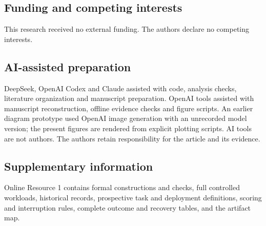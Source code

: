 \documentclass[10pt,a4paper,twocolumn]{article}
\begin{document}
\subsection*{Funding and competing interests}
This research received no external funding. The authors declare no competing interests.

\subsection*{AI-assisted preparation}
DeepSeek, OpenAI Codex and Claude assisted with code, analysis checks, literature organization and manuscript preparation. OpenAI tools assisted with manuscript reconstruction, offline evidence checks and figure scripts. An earlier diagram prototype used OpenAI image generation with an unrecorded model version; the present figures are rendered from explicit plotting scripts. AI tools are not authors. The authors retain responsibility for the article and its evidence.

\subsection*{Supplementary information}
Online Resource 1 contains formal constructions and checks, full controlled workloads, historical records, prospective task and deployment definitions, scoring and interruption rules, complete outcome and recovery tables, and the artifact map.
\end{document}
